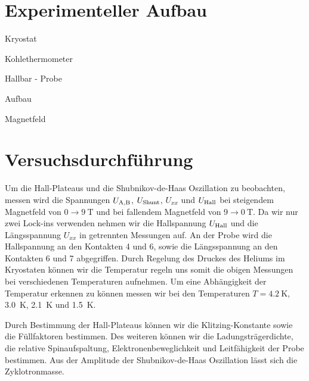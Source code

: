 \documentclass[paper=a4,fontsize=10pt,DIV=18,twocolumn,parskip=half]{scrartcl}
\numberwithin{equation}{section}    %
\begin{document}

%
\section{Experimenteller Aufbau}
\label{Experiment}
%
\begin{compactitem}
	\item Kryostat
	\item Kohlethermometer
	\item Hallbar - Probe
	\item Aufbau
	\item Magnetfeld
\end{compactitem}
%
\section{Versuchsdurchführung}
\label{versuch}
%
Um die Hall-Plateaus und die Shubnikov-de-Haas Oszillation zu beobachten, messen wird die Spannungen $U_{\rm A,B}$, $U_{\rm Shunt}$, $U_{xx}$ und $U_{\rm Hall}$ bei steigendem Magnetfeld von $0 \rightarrow \SI{9}{\tesla}$ und bei fallendem Magnetfeld von $9 \rightarrow \SI{0}{\tesla}$. Da wir nur zwei Lock-ins verwenden nehmen wir die Hallspannung $U_{\rm Hall}$ und die Längsspannung $U_{xx}$ in getrennten Messungen auf. An der Probe wird die Hallspannung an den Kontakten 4 und 6, sowie die Längsspannung an den Kontakten 6 und 7 abgegriffen. Durch Regelung des Druckes des Heliums im Kryostaten können wir die Temperatur regeln uns somit die obigen Messungen bei verschiedenen Temperaturen aufnehmen.
Um eine Abhängigkeit der Temperatur erkennen zu können messen wir bei den Temperaturen $T=\SI{4.2}{\kelvin}$, \SI{3.0}{\kelvin}, \SI{2.1}{\kelvin} und \SI{1.5}{\kelvin}.

Durch Bestimmung der Hall-Plateaus können wir die Klitzing-Konstante sowie die Füllfaktoren bestimmen. Des weiteren können wir die Ladungsträgerdichte, die relative Spinaufspaltung, Elektronenbeweglichkeit und Leitfähigkeit der Probe bestimmen. Aus der Amplitude der Shubnikov-de-Haas Oszillation lässt sich die Zyklotronmasse.
\end{document}
